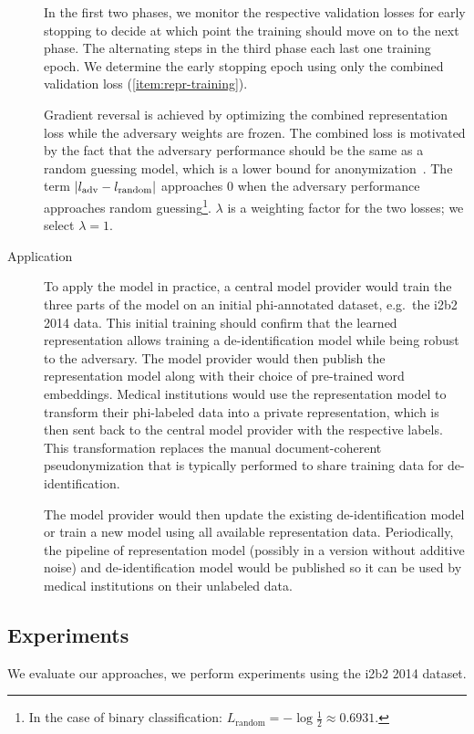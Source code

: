 \begin{description}
    In the first two phases, we monitor the respective validation losses for early stopping to decide at which point the training should move on to the next phase.
    The alternating steps in the third phase each last one training epoch.
    We determine the early stopping epoch using only the combined validation loss (\cref{item:repr-training}).
    
    Gradient reversal is achieved by optimizing the combined representation loss while the adversary weights are frozen.
    The combined loss is motivated by the fact that the adversary performance should be the same as a random guessing model, which is a lower bound for anonymization~\citep{feutry2018learning}.
    The term $\lvert l_{\text{adv}} - l_{\text{random}}\rvert$ approaches $0$ when the adversary performance approaches random guessing\footnote{In the case of binary classification: $L_{\text{random}} = -\log \frac{1}{2} \approx 0.6931$.}.
    $\lambda$ is a weighting factor for the two losses; we select $\lambda=1$.

    \item[Application]
    To apply the model in practice, a central model provider would train the three parts of the model on an initial \ac{phi}-annotated dataset, e.g.\ the i2b2 2014 data.
    This initial training should confirm that the learned representation allows training a de-identification model while being robust to the adversary.
    The model provider would then publish the representation model along with their choice of pre-trained word embeddings.
    Medical institutions would use the representation model to transform their \ac{phi}-labeled data into a private representation, which is then sent back to the central model provider with the respective labels.
    This transformation replaces the manual document-coherent pseudonymization that is typically performed to share training data for de-identification.
    
    The model provider would then update the existing de-identification model or train a new model using all available representation data.
    Periodically, the pipeline of representation model (possibly in a version without additive noise) and de-identification model would be published so it can be used by medical institutions on their unlabeled data.
\end{description}

\subsection{Experiments}
%
We evaluate our approaches, we perform experiments using the i2b2 2014 dataset.
%

